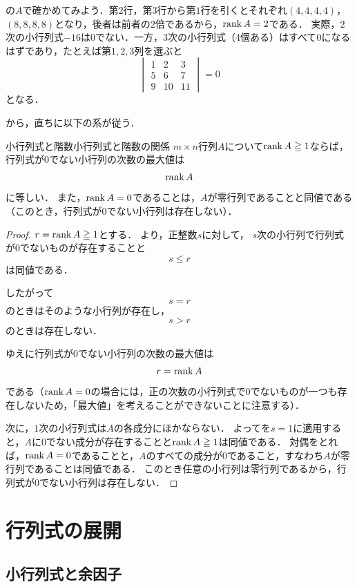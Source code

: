 の$A$で確かめてみよう．第$2$行，第$3$行から第$1$行を引くとそれぞれ$(4, 4, 4, 4)$，$(8, 8, 8, 8)$となり，後者は前者の$2$倍であるから，$\operatorname{rank} A = 2$である．
実際，$2$次の小行列式$-16$は$0$でない．一方，$3$次の小行列式（$4$個ある）はすべて$0$になるはずであり，たとえば第$1,2,3$列を選ぶと
\[
  \begin{vmatrix} 1 & 2 & 3 \\ 5 & 6 & 7 \\ 9 & 10 & 11 \end{vmatrix} = 0
\]
となる．

から，直ちに以下の系が従う．

\begin{cor}{小行列式と階数}{小行列式と階数の関係}
  $m\times n$行列$A$について$\operatorname{rank} A \geqq 1$ならば，
  行列式が$0$でない小行列の次数の最大値は
  \[
    \operatorname{rank} A
  \]
  に等しい．
  また，$\operatorname{rank} A = 0$であることは，$A$が零行列であることと同値である
  （このとき，行列式が$0$でない小行列は存在しない）．
\end{cor}

\begin{tleftbar}
\begin{proof}
$r = \operatorname{rank} A \geqq 1$とする．
より，正整数$s$に対して，
$s$次の小行列で行列式が$0$でないものが存在することと
\[
s\le r
\]
は同値である．

したがって
\[
s=r
\]
のときはそのような小行列が存在し，
\[
s>r
\]
のときは存在しない．

ゆえに行列式が$0$でない小行列の次数の最大値は
\[
r=\operatorname{rank} A
\]
である（$\operatorname{rank} A = 0$の場合には，正の次数の小行列式で$0$でないものが一つも存在しないため，「最大値」を考えることができないことに注意する）．

次に，$1$次の小行列式は$A$の各成分にほかならない．
よってを$s = 1$に適用すると，$A$に$0$でない成分が存在することと$\operatorname{rank} A \geqq 1$は同値である．
対偶をとれば，$\operatorname{rank} A = 0$であることと，$A$のすべての成分が$0$であること，すなわち$A$が零行列であることは同値である．
このとき任意の小行列は零行列であるから，行列式が$0$でない小行列は存在しない．
\end{proof}
\end{tleftbar}

\section{行列式の展開}

\subsection{小行列式と余因子}

